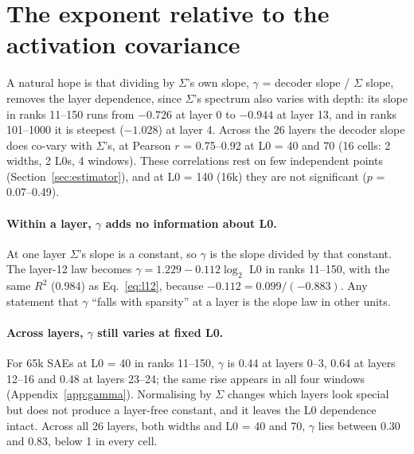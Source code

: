 \documentclass[10pt,twocolumn]{article}
\newcommand{\gam}{\gamma}
\begin{document}
\section{The exponent relative to the activation covariance}
\label{sec:gamma}

A natural hope is that dividing by $\Sigma$'s own slope, $\gam$ = decoder slope / $\Sigma$ slope, removes the layer dependence, since $\Sigma$'s spectrum also varies with depth: its slope in ranks 11--150 runs from $-0.726$ at layer 0 to $-0.944$ at layer 13, and in ranks 101--1000 it is steepest ($-1.028$) at layer 4. Across the 26 layers the decoder slope does co-vary with $\Sigma$'s, at Pearson $r$ = 0.75--0.92 at L0 = 40 and 70 (16 cells: 2 widths, 2 L0s, 4 windows). These correlations rest on few independent points (Section~\ref{sec:estimator}), and at L0 = 140 (16k) they are not significant ($p$ = 0.07--0.49).

\paragraph{Within a layer, $\gam$ adds no information about L0.} At one layer $\Sigma$'s slope is a constant, so $\gam$ is the slope divided by that constant. The layer-12 law becomes $\gam = 1.229 - 0.112 \log_2$ L0 in ranks 11--150, with the same $R^2$ (0.984) as Eq.~\ref{eq:l12}, because $-0.112 = 0.099/(-0.883)$. Any statement that $\gam$ ``falls with sparsity'' at a layer is the slope law in other units.

\paragraph{Across layers, $\gam$ still varies at fixed L0.} For 65k SAEs at L0 = 40 in ranks 11--150, $\gam$ is 0.44 at layers 0--3, 0.64 at layers 12--16 and 0.48 at layers 23--24; the same rise appears in all four windows (Appendix~\ref{app:gamma}). Normalising by $\Sigma$ changes which layers look special but does not produce a layer-free constant, and it leaves the L0 dependence intact. Across all 26 layers, both widths and L0 = 40 and 70, $\gam$ lies between 0.30 and 0.83, below 1 in every cell.
\end{document}
